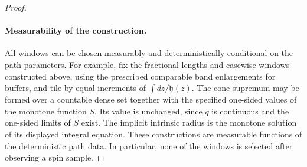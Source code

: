 \begin{proof}
\paragraph{Measurability of the construction.}
All windows can be chosen measurably and deterministically conditional
on the path parameters.  For example, fix the fractional lengths and
casewise windows constructed above, using the prescribed comparable
band enlargements for buffers, and tile by equal increments of
$\int dz/\mathfrak h(z)$.  The cone
supremum may be formed over a countable dense set together with the
specified one-sided values of the monotone function $S$.  Its value is
unchanged, since $q$ is continuous and the one-sided limits of $S$ exist.
The implicit intrinsic radius is the monotone solution of its displayed
integral equation.  These constructions are measurable functions of
the deterministic path data.  In particular, none of the windows is
selected after observing a spin sample.
\end{proof}

